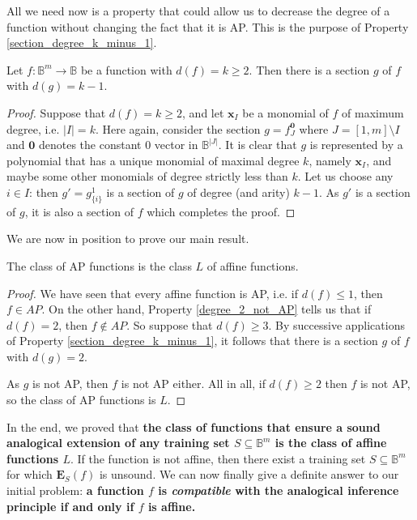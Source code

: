 All we need now is a property that could allow us to decrease the degree of a
function without changing the fact that it is AP. This is the purpose of
Property \ref{section_degree_k_minus_1}.

\begin{property}\label{section_degree_k_minus_1}
Let $f:\mathbb{B}^m\rightarrow \mathbb{B}$ be a function with
  $d(f)=k\geq 2$. Then there is a section $g$ of $f$ with $d(g)=k-1$.
\end{property}
\begin{proof}
Suppose that  $d(f)=k\geq 2$, and let $\mathbf{x}_I$ be a monomial of $f$ of
  maximum degree, i.e. $|I|=k$.  Here again, consider the section $g =
  f^{\mathbf{0}}_J$ where $J = [1, m] \setminus I$ and $\mathbf{0}$ denotes the
  constant $0$ vector in $\mathbb{B}^{|J|}$. It is clear that $g$ is
  represented by a  polynomial that has a unique monomial of maximal degree
  $k$, namely $\mathbf{x}_I$, and maybe some other monomials of degree strictly
  less than $k$.  Let us choose any $i \in I$: then $g' = g^1_{\{i\}}$ is a
  section of $g$ of degree (and arity) $k-1$. As $g'$ is a section of $g$, it
  is also a section of $f$ which completes the proof.
\end{proof}

We are now in position to prove our main result.

\begin{proposition}
  \label{PROPOS:AP_is_L}
The class of AP functions is the class $L$ of affine functions.
\end{proposition}
\begin{proof}
We have seen that every affine function is AP, i.e. if $d(f)\leq 1$, then $f\in
  AP$. On the other hand, Property \ref{degree_2_not_AP} tells us that if
  $d(f)=2$, then $f \notin AP$. So suppose that  $d(f)\geq 3$. By successive
  applications of Property \ref{section_degree_k_minus_1}, it follows that
  there is a section $g$ of $f$ with $d(g)=2$.

  As $g$ is not AP, then $f$ is not AP either. All in all, if $d(f) \geq 2$
  then $f$ is not AP, so the class of AP functions is $L$.
\end{proof}

In the end, we proved that {\bf the class of functions that ensure a sound
analogical extension of any training set $S \subseteq \mathbb{B}^m$ is the class
of affine functions $L$}. If the function is not affine, then there exist a
training set $S \subseteq \mathbb{B}^m$ for which $\mathbf{E}_S(f)$ is unsound.
We can now finally give a definite answer to our initial problem: \textbf{a
function $f$ is \textit{compatible} with the analogical inference principle if
and only if $f$ is affine.}

